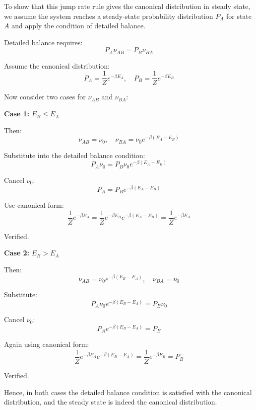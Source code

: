 \documentclass[
  letterpaper,
  enabledeprecatedfontcommands]{report}
\begin{document}
\begin{tcolorbox}[enhanced jigsaw, toprule=.15mm, opacityback=0, colbacktitle=quarto-callout-caution-color!10!white, title=\textcolor{quarto-callout-caution-color}{\faFire}\hspace{0.5em}{Solution}, leftrule=.75mm, rightrule=.15mm, bottomtitle=1mm, breakable, colframe=quarto-callout-caution-color-frame, colback=white, toptitle=1mm, left=2mm, titlerule=0mm, coltitle=black, arc=.35mm, bottomrule=.15mm, opacitybacktitle=0.6]

To show that this jump rate rule gives the canonical distribution in
steady state, we assume the system reaches a steady-state probability
distribution \(P_A\) for state \(A\) and apply the condition of detailed
balance.

Detailed balance requires: \[
P_A \nu_{AB} = P_B \nu_{BA}
\]

Assume the canonical distribution: \[
P_A = \frac{1}{Z} e^{-\beta E_A}, \quad P_B = \frac{1}{Z} e^{-\beta E_B}
\]

Now consider two cases for \(\nu_{AB}\) and \(\nu_{BA}\):

\textbf{Case 1:} \(E_B \leq E_A\)

Then: \[
\nu_{AB} = \nu_0, \quad \nu_{BA} = \nu_0 e^{-\beta (E_A - E_B)}
\]

Substitute into the detailed balance condition: \[
P_A \nu_0 = P_B \nu_0 e^{-\beta (E_A - E_B)}
\]

Cancel \(\nu_0\): \[
P_A = P_B e^{-\beta (E_A - E_B)}
\]

Use canonical form: \[
\frac{1}{Z} e^{-\beta E_A} = \frac{1}{Z} e^{-\beta E_B} e^{-\beta (E_A - E_B)} = \frac{1}{Z} e^{-\beta E_A}
\]

Verified.

\textbf{Case 2:} \(E_B > E_A\)

Then: \[
\nu_{AB} = \nu_0 e^{-\beta (E_B - E_A)}, \quad \nu_{BA} = \nu_0
\]

Substitute: \[
P_A \nu_0 e^{-\beta (E_B - E_A)} = P_B \nu_0
\]

Cancel \(\nu_0\): \[
P_A e^{-\beta (E_B - E_A)} = P_B
\]

Again using canonical form: \[
\frac{1}{Z} e^{-\beta E_A} e^{-\beta (E_B - E_A)} = \frac{1}{Z} e^{-\beta E_B} = P_B
\]

Verified.

Hence, in both cases the detailed balance condition is satisfied with
the canonical distribution, and the steady state is indeed the canonical
distribution.

\end{tcolorbox}
\end{document}
